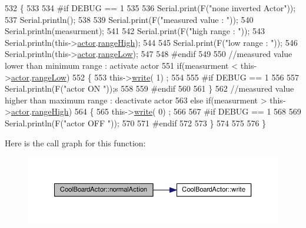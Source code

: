 \begin{DoxyCode}
532 \{
533 
534 \textcolor{preprocessor}{#if DEBUG == 1}
535     
536     Serial.print(F(\textcolor{stringliteral}{"none inverted Actor"}));
537     Serial.println();
538 
539     Serial.print(F(\textcolor{stringliteral}{"measured value : "}));
540     Serial.println(measurment);
541 
542     Serial.print(F(\textcolor{stringliteral}{"high range : "}));
543     Serial.println(this->\hyperlink{class_cool_board_actor_a8f190db9f7a39fddbcef7f152da970e9}{actor}.\hyperlink{struct_cool_board_actor_1_1state_a6e5cd6c5cd44e2decfd8d4df1853f8e3}{rangeHigh});
544 
545     Serial.print(F(\textcolor{stringliteral}{"low range : "}));
546     Serial.println(this->\hyperlink{class_cool_board_actor_a8f190db9f7a39fddbcef7f152da970e9}{actor}.\hyperlink{struct_cool_board_actor_1_1state_a43f891c9fb3bb63575c27cec860de55a}{rangeLow});
547 
548 \textcolor{preprocessor}{#endif}
549 
550     \textcolor{comment}{//measured value lower than minimum range : activate actor}
551     \textcolor{keywordflow}{if}(measurment < this->\hyperlink{class_cool_board_actor_a8f190db9f7a39fddbcef7f152da970e9}{actor}.\hyperlink{struct_cool_board_actor_1_1state_a43f891c9fb3bb63575c27cec860de55a}{rangeLow})
552     \{
553         this->\hyperlink{class_cool_board_actor_a958786ff01ea1056ee72c72d439f86da}{write}( 1) ;
554 
555 \textcolor{preprocessor}{    #if DEBUG == 1 }
556 
557         Serial.println(F(\textcolor{stringliteral}{"actor ON "}));s
558     
559 \textcolor{preprocessor}{    #endif}
560                 
561     \}
562     \textcolor{comment}{//measured value higher than maximum range : deactivate actor}
563     \textcolor{keywordflow}{else} \textcolor{keywordflow}{if}(measurment > this->\hyperlink{class_cool_board_actor_a8f190db9f7a39fddbcef7f152da970e9}{actor}.\hyperlink{struct_cool_board_actor_1_1state_a6e5cd6c5cd44e2decfd8d4df1853f8e3}{rangeHigh})
564     \{
565         this->\hyperlink{class_cool_board_actor_a958786ff01ea1056ee72c72d439f86da}{write}( 0) ;
566 
567 \textcolor{preprocessor}{    #if DEBUG == 1 }
568 
569         Serial.println(F(\textcolor{stringliteral}{"actor OFF "}));
570     
571 \textcolor{preprocessor}{    #endif}
572     
573     \}
574 
575 
576 \}
\end{DoxyCode}
Here is the call graph for this function\+:\nopagebreak
\begin{figure}[H]
\begin{center}
\leavevmode
\includegraphics[width=350pt]{dc/d69/class_cool_board_actor_a81229abf5895f4d3b0355050b822b438_cgraph}
\end{center}
\end{figure}
